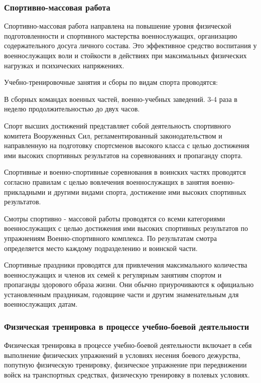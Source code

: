 \documentclass[a4paper]{article}
\begin{document}
    \subsubsection{Спортивно-массовая работа}

    Спортивно-массовая работа направлена на повышение уровня физической подготовленности и спортивного мастерства военнослужащих, организацию содержательного досуга личного состава. Это эффективное средство воспитания у военнослужащих воли и стойкости в действиях при максимальных физических нагрузках и психических напряжениях.

    Учебно-тренировочные занятия и сборы по видам спорта проводятся:

    В сборных командах военных частей, военно-учебных заведений. 3-4 раза в неделю продолжительностью до двух часов.

    Спорт высших достижений представляет собой деятельность спортивного комитета Вооруженных Сил, регламентированный законодательством и направленную на подготовку спортсменов высокого класса с целью достижения ими высоких спортивных результатов на соревнованиях и пропаганду спорта.

    Спортивные и военно-спортивные соревнования в воинских частях проводятся согласно правилам с целью вовлечения военнослужащих в занятия военно-прикладными и другими видами спорта, достижение ими высоких спортивных результатов.

    Смотры спортивно - массовой работы проводятся со всеми категориями военнослужащих с целью достижения ими высоких спортивных результатов по упражнениям Военно-спортивного комплекса. По результатам смотра определяется место каждому подразделению и воинской части.

    Спортивные праздники проводятся для привлечения максимального количества военнослужащих и членов их семей к регулярным занятиям спортом и пропаганды здорового образа жизни. Они обычно приурочиваются к официально установленным праздникам, годовщине части и другим знаменательным для военнослужащих датам.

    \subsubsection{Физическая тренировка в процессе учебно-боевой деятельности}

    Физическая тренировка в процессе учебно-боевой деятельности включает в себя выполнение физических упражнений в условиях несения боевого дежурства, попутную физическую тренировку, физическое упражнение при передвижении войск на транспортных средствах, физическую тренировку в полевых условиях.
\end{document}
